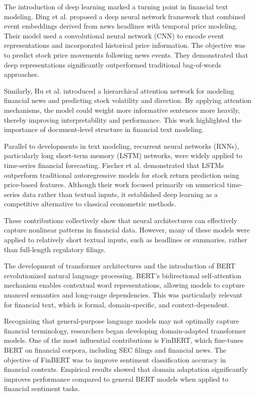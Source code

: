The introduction of deep learning marked a turning point in financial text modeling. Ding et al.\cite{ding2015deep} proposed a deep neural network framework that combined event embeddings derived from news headlines with temporal price modeling. Their model used a convolutional neural network (CNN) to encode event representations and incorporated historical price information. The objective was to predict stock price movements following news events. They demonstrated that deep representations significantly outperformed traditional bag-of-words approaches.

Similarly, Hu et al.\cite{hu2018listening} introduced a hierarchical attention network for modeling financial news and predicting stock volatility and direction. By applying attention mechanisms, the model could weight more informative sentences more heavily, thereby improving interpretability and performance. This work highlighted the importance of document-level structure in financial text modeling.

Parallel to developments in text modeling, recurrent neural networks (RNNs), particularly long short-term memory (LSTM) networks, were widely applied to time-series financial forecasting. Fischer et al.\cite{fischer2018deep} demonstrated that LSTMs outperform traditional autoregressive models for stock return prediction using price-based features. Although their work focused primarily on numerical time-series data rather than textual inputs, it established deep learning as a competitive alternative to classical econometric methods.

These contributions collectively show that neural architectures can effectively capture nonlinear patterns in financial data. However, many of these models were applied to relatively short textual inputs, such as headlines or summaries, rather than full-length regulatory filings.

The development of transformer architectures\cite{vaswani2017attention} and the introduction of BERT\cite{devlin2019bertpretrainingdeepbidirectional} revolutionized natural language processing. BERT's bidirectional self-attention mechanism enables contextual word representations, allowing models to capture nuanced semantics and long-range dependencies. This was particularly relevant for financial text, which is formal, domain-specific, and context-dependent.

Recognizing that general-purpose language models may not optimally capture financial terminology, researchers began developing domain-adapted transformer models. One of the most influential contributions is FinBERT\cite{yang2020finbert}, which fine-tunes BERT on financial corpora, including SEC filings and financial news. The objective of FinBERT was to improve sentiment classification accuracy in financial contexts. Empirical results showed that domain adaptation significantly improves performance compared to general BERT models when applied to financial sentiment tasks.

